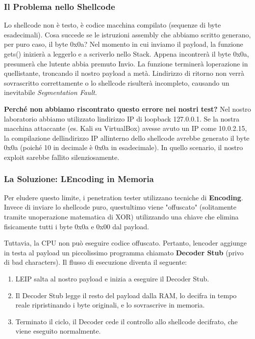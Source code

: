 \documentclass[11pt,a4paper]{article}
\begin{document}
\subsubsection{Il Problema nello
Shellcode}\label{il-problema-nello-shellcode}

Lo shellcode non è testo, è codice macchina compilato (sequenze di byte
esadecimali). Cosa succede se le istruzioni assembly che abbiamo scritto
generano, per puro caso, il byte 0x0a? Nel momento in cui inviamo il
payload, la funzione gets() inizierà a leggerlo e a scriverlo nello
Stack. Appena incontrerà il byte 0x0a, presumerà che
l\textquotesingle utente abbia premuto Invio. La funzione terminerà
l\textquotesingle operazione in quell\textquotesingle istante, troncando
il nostro payload a metà. L\textquotesingle indirizzo di ritorno non
verrà sovrascritto correttamente o lo shellcode risulterà incompleto,
causando un inevitabile \emph{Segmentation Fault}.

\textbf{Perché non abbiamo riscontrato questo errore nei nostri test?}
Nel nostro laboratorio abbiamo utilizzato l\textquotesingle indirizzo IP
di loopback 127.0.0.1. Se la nostra macchina attaccante (es. Kali su
VirtualBox) avesse avuto un IP come 10.0.2.15, la compilazione
dell\textquotesingle indirizzo IP all\textquotesingle interno dello
shellcode avrebbe generato il byte 0x0a (poiché 10 in decimale è 0x0a in
esadecimale). In quello scenario, il nostro exploit sarebbe fallito
silenziosamente.

\subsubsection{La Soluzione: L\textquotesingle Encoding in
Memoria}\label{la-soluzione-lencoding-in-memoria}

Per eludere questo limite, i penetration tester utilizzano tecniche di
\textbf{Encoding}. Invece di inviare lo shellcode puro,
quest\textquotesingle ultimo viene "offuscato" (solitamente tramite
un\textquotesingle operazione matematica di XOR) utilizzando una chiave
che elimina fisicamente tutti i byte 0x0a e 0x00 dal payload.

Tuttavia, la CPU non può eseguire codice offuscato. Pertanto,
l\textquotesingle encoder aggiunge in testa al payload un piccolissimo
programma chiamato \textbf{Decoder Stub} (privo di bad characters). Il
flusso di esecuzione diventa il seguente:

\begin{enumerate}
\def\labelenumi{\arabic{enumi}.}
\item
  L\textquotesingle EIP salta al nostro payload e inizia a eseguire il
  Decoder Stub.
\item
  Il Decoder Stub legge il resto del payload dalla RAM, lo decifra in
  tempo reale ripristinando i byte originali, e lo sovrascrive in
  memoria.
\item
  Terminato il ciclo, il Decoder cede il controllo allo shellcode
  decifrato, che viene eseguito normalmente.
\end{enumerate}
\end{document}
